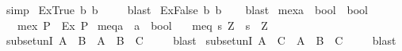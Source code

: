 \begin{isabellebody}
%
\isatagproof
{}\isamarkupfalse%
\ simp%
\endisatagproof
{\isafoldproof}%
%
\isadelimproof
\isanewline
%
\endisadelimproof
\isanewline
{}\isamarkupfalse%
\ Ex{\isacharunderscore}True{\isacharcolon}\ {\isachardoublequoteopen}{\isasymexists}b{\isachardot}\ b{\isachardoublequoteclose}\isanewline
%
\isadelimproof
\ \ \ %
\endisadelimproof
%
\isatagproof
{}\isamarkupfalse%
\ blast%
\endisatagproof
{\isafoldproof}%
%
\isadelimproof
\isanewline
%
\endisadelimproof
\isanewline
{}\isamarkupfalse%
\ Ex{\isacharunderscore}False{\isacharcolon}\ {\isachardoublequoteopen}{\isasymexists}b{\isachardot}\ {\isasymnot}b{\isachardoublequoteclose}\isanewline
%
\isadelimproof
\ \ %
\endisadelimproof
%
\isatagproof
{}\isamarkupfalse%
\ blast%
\endisatagproof
{\isafoldproof}%
%
\isadelimproof
\isanewline
%
\endisadelimproof
\isanewline
{}\isamarkupfalse%
\ mex{\isacharcolon}{\isacharcolon}{\isachardoublequoteopen}{\isacharparenleft}{\isacharprime}a\ {\isasymRightarrow}\ bool{\isacharparenright}\ {\isasymRightarrow}\ bool{\isachardoublequoteclose}\isanewline
\ \ \ {\isachardoublequoteopen}mex\ P\ {\isacharequal}\ Ex\ P{\isachardoublequoteclose}\isanewline
\isanewline
{}\isamarkupfalse%
\ meq{\isacharcolon}{\isacharcolon}{\isachardoublequoteopen}{\isacharprime}a\ {\isasymRightarrow}\ {\isacharprime}a\ {\isasymRightarrow}\ bool{\isachardoublequoteclose}\isanewline
\ \ \ {\isachardoublequoteopen}meq\ s\ Z\ {\isacharequal}\ {\isacharparenleft}s\ {\isacharequal}\ Z{\isacharparenright}{\isachardoublequoteclose}\isanewline
\isanewline
{}\isamarkupfalse%
\ subset{\isacharunderscore}unI{}{\isacharcolon}\ {\isachardoublequoteopen}A\ {\isasymsubseteq}\ B\ {\isasymLongrightarrow}\ A\ {\isasymsubseteq}\ B\ {\isasymunion}\ C{\isachardoublequoteclose}\ \isanewline
%
\isadelimproof
\ \ %
\endisadelimproof
%
\isatagproof
{}\isamarkupfalse%
\ blast%
\endisatagproof
{\isafoldproof}%
%
\isadelimproof
\isanewline
%
\endisadelimproof
\isanewline
{}\isamarkupfalse%
\ subset{\isacharunderscore}unI{}{\isacharcolon}\ {\isachardoublequoteopen}A\ {\isasymsubseteq}\ C\ {\isasymLongrightarrow}\ A\ {\isasymsubseteq}\ B\ {\isasymunion}\ C{\isachardoublequoteclose}\ \isanewline
%
\isadelimproof
\ \ %
\endisadelimproof
%
\isatagproof
{}\isamarkupfalse%
\ blast%
\endisatagproof
{\isafoldproof}%
%
\isadelimproof
\isanewline
%
\endisadelimproof
\isanewline
{}\isamarkupfalse%

\end{isabellebody}
